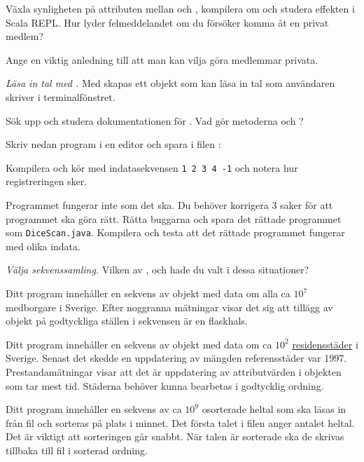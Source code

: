 \Subtask Växla synligheten på attributen mellan  och , kompilera om och studera effekten i Scala REPL. Hur lyder felmeddelandet om du försöker komma åt en privat medlem?

\Subtask\Pen Ange en viktig anledning till att man kan vilja göra medlemmar privata.



\Task \emph{Läsa in tal med .} Med  skapas ett objekt som kan läsa in tal som användaren skriver i terminalfönstret.

\Subtask Sök upp och studera dokumentationen för . Vad gör metoderna  och ?

\Subtask Skriv nedan program i en editor och spara i filen :


\Subtask Kompilera och kör med indatasekvensen \texttt{1 2 3 4 -1} och notera hur registreringen sker.

\Subtask Programmet fungerar inte som det ska. Du behöver korrigera 3 saker för att programmet ska göra rätt. Rätta buggarna och spara det rättade programmet som \texttt{DiceScan.java}. Kompilera och testa att det rättade programmet fungerar med olika indata.


\Task\Pen \emph{Välja sekvenssamling.} Vilken av ,  och  hade du valt i dessa situationer?

\Subtask Ditt program innehåller en sekvens av objekt med data om alla ca $10^7$ medborgare i Sverige. Efter noggranna mätningar visar det sig att tillägg av objekt på godtyckliga ställen i sekvensen är en flaskhals.

\Subtask Ditt program innehåller en sekvens av objekt med data om ca $10^2$ \href{https://sv.wikipedia.org/wiki/Residensstad#Sverige}{residensstäder} i Sverige. Senast det skedde en uppdatering av mängden referensstäder var 1997. Prestandamätningar visar att det är uppdatering av attributvärden i objekten som tar mest tid. Städerna behöver kunna bearbetas i godtycklig ordning.

\Subtask Ditt program innehåller en sekvens av ca $10^9$ osorterade heltal som ska läsas in från fil och sorteras på plats i minnet. Det första talet i filen anger antalet heltal. Det är viktigt att sorteringen går snabbt. När talen är sorterade ska de skrivas tillbaka till fil i sorterad ordning.

